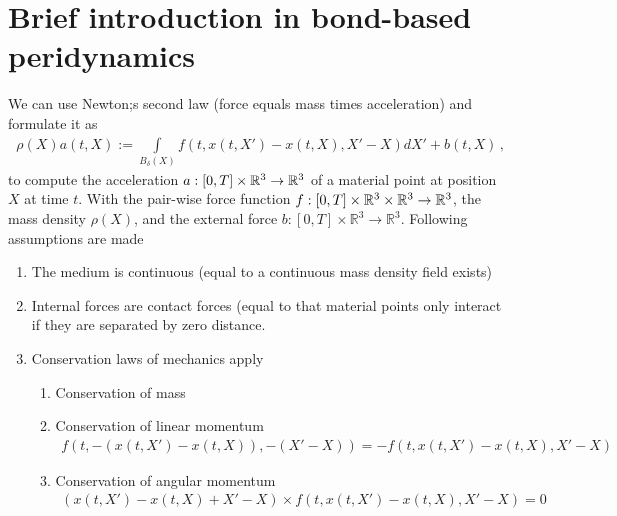 \section{Brief introduction in bond-based peridynamics}
We can use Newton;s second law (force equals mass times acceleration) and formulate it as
\begin{align}
\rho(X)a(t,X):=
\int\limits_{B_\delta(X)} f\left(t,x(t,X')-x(t,X), X'-X\right)dX' + b(t,X)\,\text{,}
\label{eq::chapter2:01}
\end{align}
to compute the acceleration $a:[0,T]\times\mathbb{R}^3\rightarrow\mathbb{R}^3$ of a material point at position $X$ at time $t$. With the pair-wise force function $f:[0,T]\times\mathbb{R}^3\times\mathbb{R}^3\rightarrow\mathbb{R}^3$, the mass density $\rho(X)$, and the external force $b:[0,T]\times\mathbb{R}^3\rightarrow\mathbb{R}^3$. Following assumptions are made
\begin{enumerate}
\item The medium is continuous (equal to a continuous mass density field exists)
\item Internal forces are contact forces (equal to that material points only interact if they are separated by zero distance.
\item Conservation laws of mechanics apply
\begin{enumerate}
\item Conservation of mass
\item Conservation of linear momentum
\begin{align*}
f(t,-(x(t,X')-x(t,X)),-(X'-X))= -f(t,x(t,X')-x(t,X), X'-X)
\end{align*}
\item Conservation of angular momentum
\begin{align*}
(x(t,X')-x(t,X)+X'-X) \times f\left(t,x(t,X')-x(t,X), X'-X\right) = 0
\end{align*}
\end{enumerate}
\end{enumerate}

